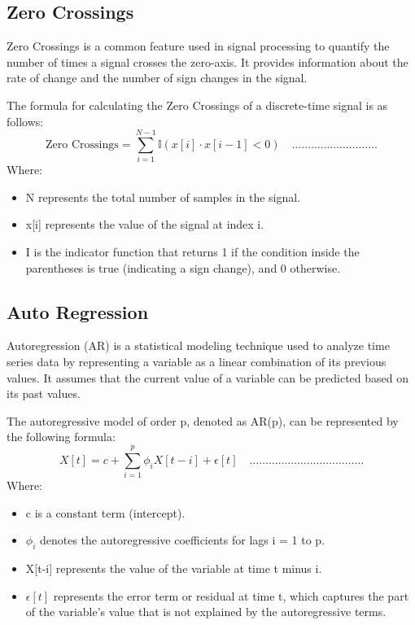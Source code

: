 \subsection{Zero Crossings}
Zero Crossings is a common feature used in signal processing to quantify the number of times a signal crosses the zero-axis. It provides information about the rate of change and the number of sign changes in the signal.
\par 
The formula for calculating the Zero Crossings of a discrete-time signal is as follows:
\begin{equation}
\label{eq: Zero Crossings}
\text{Zero Crossings} = \sum_{i=1}^{N-1} \mathbb{I}(x[i] \cdot x[i-1] < 0) \quad \dots \dots \dots  \dots \dots \dots  \dots \dots \dots
\end{equation}
Where:
\begin{itemize}
    \item N represents the total number of samples in the signal.
    \item x[i] represents the value of the signal at index i.
    \item I is the indicator function that returns 1 if the condition inside the parentheses is true (indicating a sign change), and 0 otherwise.
\end{itemize}

\subsection{Auto Regression}
Autoregression (AR) is a statistical modeling technique used to analyze time series data by representing a variable as a linear combination of its previous values. It assumes that the current value of a variable can be predicted based on its past values.
\par
The autoregressive model of order p, denoted as AR(p), can be represented by the following formula:
\begin{equation}
\label{eq: Autoregression}
X[t] = c + \sum_{i=1}^{p} \phi_i X[t-i] + \epsilon[t]  \quad \dots \dots \dots  \dots \dots \dots  \dots \dots \dots \dots \dots  \dots 
\end{equation}
Where:
\begin{itemize}
    \item c is a constant term (intercept).
    \item $\phi_i$ denotes the autoregressive coefficients for lags i = 1 to p.
    \item X[t-i] represents the value of the variable at time t minus i.
    \item $\epsilon[t]$ represents the error term or residual at time t, which captures the part of the variable's value that is not explained by the autoregressive terms.
\end{itemize}